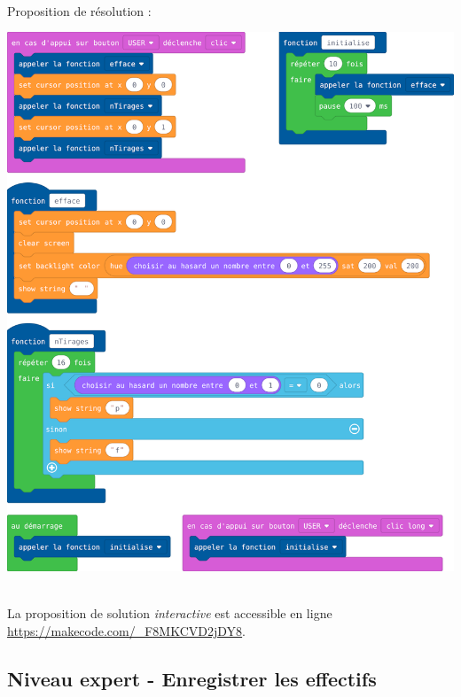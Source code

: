 \begin{minipage}[t]{0.8\linewidth}
    \begin{methode}~\\
        Proposition de résolution :
    
        \centerline{
            \includegraphics[width=\linewidth]{res/st-pf-04-prof.png}}
\end{methode}
\end{minipage}
\hfill
\begin{minipage}[t]{0.2\linewidth}
    \begin{remarque}~\\
        La proposition de solution \emph{interactive} est accessible en ligne \url{https://makecode.com/_F8MKCVD2jDY8}.
    \end{remarque}
\end{minipage}

%
%
\newpage
\subsection{Niveau expert - Enregistrer les effectifs}
